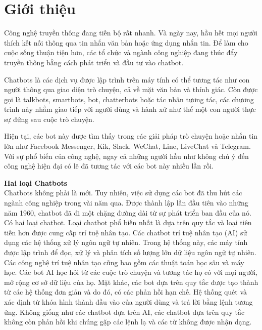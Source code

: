 \section{Giới thiệu}
Công nghệ truyền thông đang tiến bộ rất nhanh. Và ngày nay, hầu hết mọi người thích kết nối thông qua tin nhắn văn bản hoặc ứng dụng nhắn tin.
Để làm cho cuộc sống thuận tiện hơn, các tổ chức và ngành công nghiệp đang thúc đẩy truyền thông bằng cách phát triển và đầu tư vào chatbot.

Chatbots là các dịch vụ được lập trình trên máy tính có thể tương tác như con người thông qua giao diện trò chuyện, cả về mặt văn bản và thính giác. Còn được gọi là talkbots, smartbots, bot, chatterbots hoặc tác nhân tương tác, các chương trình này nhằm giao tiếp với người dùng và hành xử như thể một con người thực sự đứng sau cuộc trò chuyện.

Hiện tại, các bot này được tìm thấy trong các giải pháp trò chuyện hoặc nhắn tin lớn như Facebook Messenger, Kik, Slack, WeChat, Line, LiveChat và Telegram. Với sự phổ biến của công nghệ, ngay cả những người hầu như không chú ý đến công nghệ hiện đại có lẽ đã tương tác với các bot này nhiều lần rồi.

\textbf{Hai loại Chatbots} \\[0.2em]
Chatbots không phải là mới. Tuy nhiên, việc sử dụng các bot đã thu hút các ngành công nghiệp trong vài năm qua. Được thành lập lần đầu tiên vào những năm 1960, chatbot đã đi một chặng đường dài từ sự phát triển ban đầu của nó. Có hai loại chatbot. Loại chatbot phổ biến nhất là dựa trên quy tắc và loại tiên tiến hơn được cung cấp trí tuệ nhân tạo.
Các chatbot trí tuệ nhân tạo (AI) sử dụng các hệ thống xử lý ngôn ngữ tự nhiên. Trong hệ thống này, các máy tính được lập trình để đọc, xử lý và phân tích số lượng lớn dữ liệu ngôn ngữ tự nhiên. Các công nghệ trí tuệ nhân tạo cũng bao gồm các thuật toán học sâu và máy học. Các bot AI học hỏi từ các cuộc trò chuyện và tương tác họ có với mọi người, mở rộng cơ sở dữ liệu của họ.
Mặt khác, các bot dựa trên quy tắc được tạo thành từ các hệ thống đơn giản và do đó, có các phản hồi hạn chế. Hệ thống quét và xác định từ khóa hình thành đầu vào của người dùng và trả lời bằng lệnh tương ứng. Không giống như các chatbot dựa trên AI, các chatbot dựa trên quy tắc không còn phản hồi khi chúng gặp các lệnh lạ và các từ không được nhận dạng.

